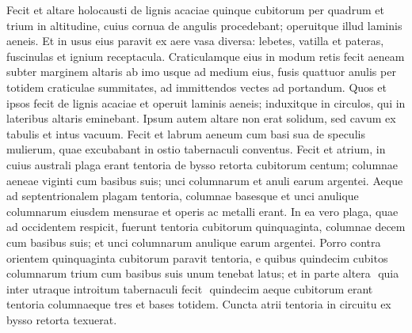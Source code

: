 \begin{biblechapter}
\begin{biblechapter}
\begin{biblechapter}
\begin{biblechapter}
\begin{biblechapter}
\begin{biblechapter}
\begin{biblechapter}
\begin{biblechapter}
\begin{biblechapter}
\begin{biblechapter}
\begin{biblechapter}
\begin{biblechapter}
\begin{biblechapter}
\begin{biblechapter}
\begin{biblechapter}
\begin{biblechapter}
\begin{biblechapter}
\begin{biblechapter}
\begin{biblechapter}
\begin{biblechapter}
\begin{biblechapter}
\begin{biblechapter}
\begin{biblechapter}
\begin{biblechapter}
\begin{biblechapter}
\begin{biblechapter}
\begin{biblechapter}
\begin{biblechapter}
\begin{biblechapter}
\begin{biblechapter}
\begin{biblechapter}
\begin{biblechapter}
\begin{biblechapter}
\begin{biblechapter}
\begin{biblechapter}
\begin{biblechapter}
\begin{biblechapter}
\begin{biblechapter}
\verse Fecit et altare holocausti de lignis acaciae quinque cubitorum per quadrum et trium in altitudine, 
\verse cuius cornua de angulis procedebant; operuitque illud laminis aeneis. 
\verse Et in usus eius paravit ex aere vasa diversa: lebetes, vatilla et pateras, fuscinulas et ignium receptacula. 
\verse Craticulamque eius in modum retis fecit aeneam subter marginem altaris ab imo usque ad medium eius, 
\verse fusis quattuor anulis per totidem craticulae summitates, ad immittendos vectes ad portandum. 
\verse Quos et ipsos fecit de lignis acaciae et operuit laminis aeneis; 
\verse induxitque in circulos, qui in lateribus altaris eminebant. Ipsum autem altare non erat solidum, sed cavum ex tabulis et intus vacuum.
 \verse Fecit et labrum aeneum cum basi sua de speculis mulierum, quae excubabant in ostio tabernaculi conventus.
 \verse Fecit et atrium, in cuius australi plaga erant tentoria de bysso retorta cubitorum centum; 
\verse columnae aeneae viginti cum basibus suis; unci columnarum et anuli earum argentei. 
\verse Aeque ad septentrionalem plagam tentoria, columnae basesque et unci anulique columnarum eiusdem mensurae et operis ac metalli erant. 
\verse In ea vero plaga, quae ad occidentem respicit, fuerunt tentoria cubitorum quinquaginta, columnae decem cum basibus suis; et unci columnarum anulique earum argentei. 
\verse Porro contra orientem quinquaginta cubitorum paravit tentoria, 
\verse e quibus quindecim cubitos columnarum trium cum basibus suis unum tenebat latus; 
\verse et in parte altera ­ quia inter utraque introitum tabernaculi fecit ­ quindecim aeque cubitorum erant tentoria columnaeque tres et bases totidem. 
\verse Cuncta atrii tentoria in circuitu ex bysso retorta texuerat. 

\end{biblechapter}
\end{biblechapter}
\end{biblechapter}
\end{biblechapter}
\end{biblechapter}
\end{biblechapter}
\end{biblechapter}
\end{biblechapter}
\end{biblechapter}
\end{biblechapter}
\end{biblechapter}
\end{biblechapter}
\end{biblechapter}
\end{biblechapter}
\end{biblechapter}
\end{biblechapter}
\end{biblechapter}
\end{biblechapter}
\end{biblechapter}
\end{biblechapter}
\end{biblechapter}
\end{biblechapter}
\end{biblechapter}
\end{biblechapter}
\end{biblechapter}
\end{biblechapter}
\end{biblechapter}
\end{biblechapter}
\end{biblechapter}
\end{biblechapter}
\end{biblechapter}
\end{biblechapter}
\end{biblechapter}
\end{biblechapter}
\end{biblechapter}
\end{biblechapter}
\end{biblechapter}
\end{biblechapter}
